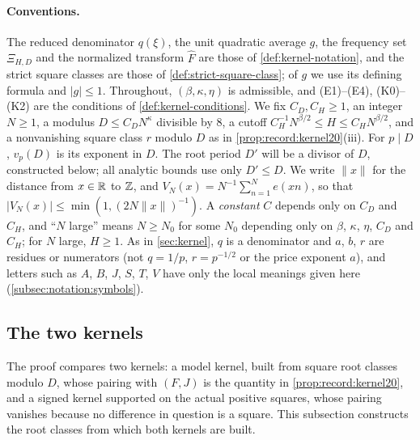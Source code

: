 \paragraph{Conventions.}
The reduced denominator $q(\xi)$, the unit quadratic average $g$, the
frequency set $\Xi_{H,D}$ and the normalized transform $\widehat F$ are those
of \cref{def:kernel-notation}, and the strict square classes are those of
\cref{def:strict-square-class}; of $g$ we use its defining formula and
$|g|\le1$. Throughout, $(\beta,\kappa,\eta)$ is
admissible, and (E1)--(E4), (K0)--(K2) are the conditions of
\cref{def:kernel-conditions}. We fix $C_D,C_H\ge1$, an integer $N\ge1$,
a modulus $D\le C_DN^\kappa$ divisible by $8$, a cutoff
$C_H^{-1}N^{\beta/2}\le H\le C_HN^{\beta/2}$, and a nonvanishing square
class $r$ modulo $D$ as in \cref{prop:record:kernel20}(iii). For $p\mid D$,
$v_p(D)$ is its exponent in $D$. The root period $D'$ will be a divisor of
$D$, constructed below; all analytic bounds use only $D'\le D$.
We write $\|x\|$ for the distance
from $x\in\mathbb R$ to $\mathbb Z$, and $V_N(x)=N^{-1}\sum_{n=1}^Ne(xn)$, so that
$|V_N(x)|\le\min(1,(2N\|x\|)^{-1})$. A \emph{constant} $C$ depends only on $C_D$ and $C_H$, and ``$N$ large''
means $N\ge N_0$ for some $N_0$ depending only on $\beta$, $\kappa$, $\eta$,
$C_D$ and $C_H$; for $N$ large, $H\ge1$. As in \cref{sec:kernel}, $q$ is a
denominator and $a$, $b$, $r$ are residues or numerators (not $q=1/p$,
$r=p^{-1/2}$ or the price exponent $a$), and letters such as $A$, $B$, $J$,
$S$, $T$, $V$ have only the local meanings given here
(\cref{subsec:notation:symbols}).

\subsection{The two kernels}

The proof compares two kernels: a model kernel, built from square
root classes modulo $D$, whose pairing with $(F,J)$ is the quantity
in \cref{prop:record:kernel20}, and a signed kernel supported on
the actual positive squares, whose pairing vanishes because no
difference in question is a square. This subsection constructs the
root classes from which both kernels are built.

